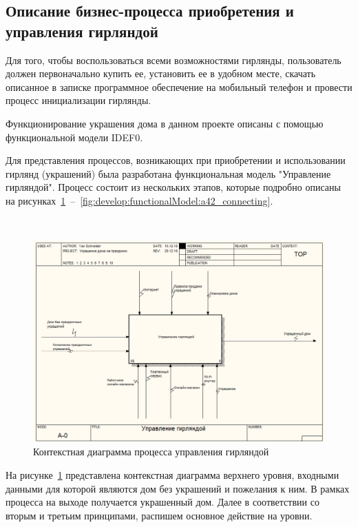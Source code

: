 \subsection{Описание бизнес-процесса приобретения и управления гирляндой}
\label{sec:analysis:businessProccess}

Для того, чтобы воспользоваться всеми возможностями гирлянды, пользователь должен первоначально купить ее, установить ее в удобном месте, скачать описанное в записке программное обеспечение на мобильный телефон и провести процесс инициализации гирлянды.

Функционирование украшения дома в данном проекте описаны с помощью функциональной модели IDEF0.

Для представления процессов, возникающих при приобретении и использовании гирлянд (украшений) была разработана функциональная модель "Управление гирляндой". Процесс состоит из нескольких этапов, которые подробно описаны на рисунках~\ref{fig:develop:functionalModel:main}~–~\ref{fig:develop:functionalModel:a42_connecting}.

~
\begin{figure}[H]
\centering
	\includegraphics[scale=0.45]{figures/functionalModel/main.jpg}
	\caption{Контекстная диаграмма процесса управления гирляндой}
	\label{fig:develop:functionalModel:main}
\end{figure}

На рисунке~\ref{fig:develop:functionalModel:main} представлена контекстная диаграмма верхнего уровня, входными данными для которой являются дом без украшений и пожелания к ним. В рамках процесса на выходе получается украшенный дом. Далее в соответствии со вторым и третьим принципами, распишем основное действие на уровни.


